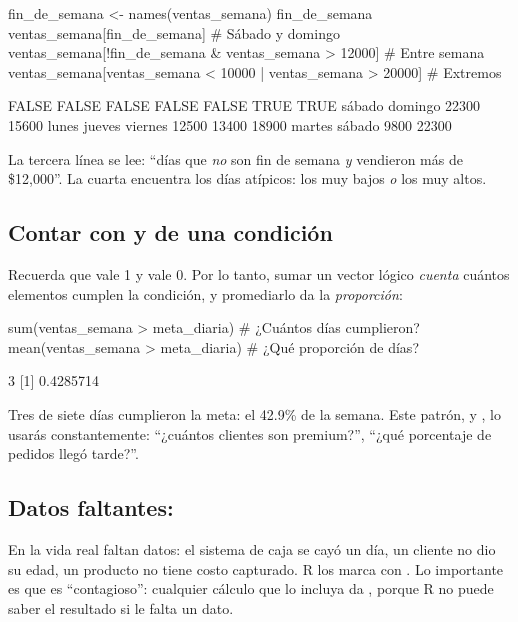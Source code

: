 \begin{rcode}
fin_de_semana <- names(ventas_semana) %
fin_de_semana
ventas_semana[fin_de_semana]                      # Sábado y domingo
ventas_semana[!fin_de_semana & ventas_semana > 12000]  # Entre semana
ventas_semana[ventas_semana < 10000 | ventas_semana > 20000]  # Extremos
\end{rcode}
\begin{rsalida}
[1] FALSE FALSE FALSE FALSE FALSE  TRUE  TRUE
 sábado domingo 
  22300   15600 
  lunes  jueves viernes 
  12500   13400   18900 
martes sábado 
  9800  22300 
\end{rsalida}

La tercera línea se lee: ``días que \emph{no} son fin de semana \emph{y}
vendieron más de \$12,000''. La cuarta encuentra los días atípicos: los
muy bajos \emph{o} los muy altos.

\subsection{Contar con \texorpdfstring{}{sum()} y \texorpdfstring{}{mean()} de una condición}

Recuerda que  vale 1 y  vale 0. Por lo tanto,
sumar un vector lógico \emph{cuenta} cuántos elementos cumplen la
condición, y promediarlo da la \emph{proporción}:

\begin{rcode}
sum(ventas_semana > meta_diaria)       # ¿Cuántos días cumplieron?
mean(ventas_semana > meta_diaria)      # ¿Qué proporción de días?
\end{rcode}
\begin{rsalida}
[1] 3
[1] 0.4285714
\end{rsalida}

Tres de siete días cumplieron la meta: el 42.9\% de la semana. Este patrón,
 y , lo usarás
constantemente: ``¿cuántos clientes son premium?'', ``¿qué porcentaje de
pedidos llegó tarde?''.

\subsection{Datos faltantes: \texorpdfstring{}{NA}}

En la vida real faltan datos: el sistema de caja se cayó un día, un cliente
no dio su edad, un producto no tiene costo capturado. R los marca con
. Lo importante es que  es ``contagioso'': cualquier
cálculo que lo incluya da , porque R no puede saber el resultado
si le falta un dato.

